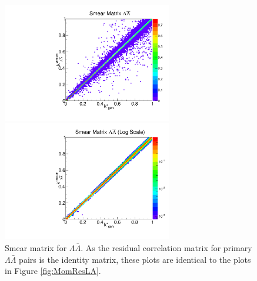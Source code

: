 \begin{figure}[ht]
\begin{minipage}{17.5pc}
\includegraphics[width=17.5pc]{Figures/SmearMatrices/2016-7-19-SmearMatrixLambdaLambdaNormLA.pdf}
\end{minipage}\hspace{0.5pc}
\begin{minipage}{17.5pc}
\includegraphics[width=17.5pc]{Figures/SmearMatrices/2016-7-19-SmearMatrixLambdaLambdaNormLALog.pdf}
\end{minipage} 
\caption[Smear matrix -- $\Lambda\bar{\Lambda}$]{\label{fig:SmearLA} 
Smear matrix for $\Lambda\bar{\Lambda}$. As the residual correlation matrix for primary $\Lambda\bar{\Lambda}$ pairs is the identity matrix, these plots are identical to the plots in Figure \ref{fig:MomResLA}.}
\end{figure}

